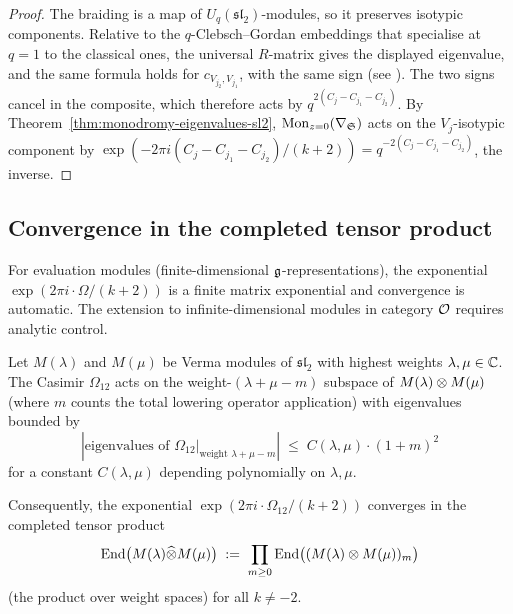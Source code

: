 \begin{proof}
The braiding is a map of $U_q(\mathfrak{sl}_2)$-modules, so it preserves isotypic components. Relative to the $q$-Clebsch--Gordan embeddings that specialise at $q = 1$ to the classical ones, the universal $R$-matrix gives the displayed eigenvalue, and the same formula holds for $c_{V_{j_2},V_{j_1}}$, with the same sign (see \cite{KL93}). The two signs cancel in the composite, which therefore acts by $q^{2(C_j - C_{j_1} - C_{j_2})}$. By Theorem~\ref{thm:monodromy-eigenvalues-sl2}, $\mathrm{Mon}_{z=0}(\nabla_{\mathfrak{S}})$ acts on the $V_j$-isotypic component by $\exp(-2\pi i(C_j - C_{j_1} - C_{j_2})/(k+2)) = q^{-2(C_j - C_{j_1} - C_{j_2})}$, the inverse.
\end{proof}

\subsection{Convergence in the completed tensor product}
\label{subsec:convergence}

For evaluation modules (finite-dimensional $\mathfrak{g}$-representations), the exponential $\exp(2\pi i \cdot \Omega/(k+2))$ is a finite matrix exponential and convergence is automatic. The extension to infinite-dimensional modules in category $\mathcal{O}$ requires analytic control.

\begin{proposition}
\label{prop:convergence-verma}
Let $M(\lambda)$ and $M(\mu)$ be Verma modules of $\mathfrak{sl}_2$ with highest weights $\lambda, \mu \in \mathbb C$. The Casimir $\Omega_{12}$ acts on the weight-$(\lambda + \mu - m)$ subspace of $M(\lambda) \otimes M(\mu)$ (where $m$ counts the total lowering operator application) with eigenvalues bounded by
\[
 |\text{eigenvalues of } \Omega_{12}\big|_{\text{weight } \lambda+\mu-m}|
 \;\leq\;
 C(\lambda,\mu) \cdot (1+m)^2
\]
for a constant $C(\lambda,\mu)$ depending polynomially on $\lambda, \mu$.

Consequently, the exponential $\exp(2\pi i \cdot \Omega_{12}/(k+2))$ converges in the completed tensor product
\[
 \mathrm{End}\bigl(M(\lambda) \widehat\otimes M(\mu)\bigr) \;:=\; \prod_{m \geq 0} \mathrm{End}\bigl((M(\lambda) \otimes M(\mu))_m\bigr)
\]
(the product over weight spaces) for all $k \neq -2$.
\end{proposition}

